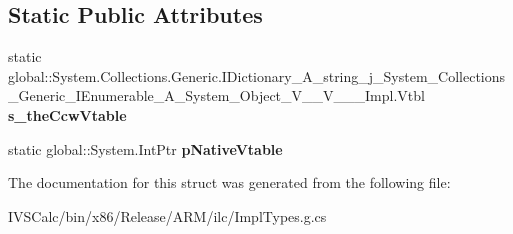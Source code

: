 \subsection*{Static Public Attributes}
\begin{DoxyCompactItemize}
\item 
\mbox{\label{struct_system_1_1_collections_1_1_generic_1_1_i_dictionary___a__string__j___system___collectionsedc27740e4e948ffc8828d48179ed85a_aba0e7207523bc23c4717824da3e0556f}} 
static global\+::\+System.\+Collections.\+Generic.\+I\+Dictionary\+\_\+\+A\+\_\+string\+\_\+j\+\_\+\+System\+\_\+\+Collections\+\_\+\+Generic\+\_\+\+I\+Enumerable\+\_\+\+A\+\_\+\+System\+\_\+\+Object\+\_\+\+V\+\_\+\+\_\+\+V\+\_\+\+\_\+\+\_\+\+Impl.\+Vtbl {\bfseries s\+\_\+the\+Ccw\+Vtable}
\item 
\mbox{\label{struct_system_1_1_collections_1_1_generic_1_1_i_dictionary___a__string__j___system___collectionsedc27740e4e948ffc8828d48179ed85a_a2e85dcfcd6ef0a898cc2aacfea2d9ddc}} 
static global\+::\+System.\+Int\+Ptr {\bfseries p\+Native\+Vtable}
\end{DoxyCompactItemize}


The documentation for this struct was generated from the following file\+:\begin{DoxyCompactItemize}
\item 
I\+V\+S\+Calc/bin/x86/\+Release/\+A\+R\+M/ilc/Impl\+Types.\+g.\+cs\end{DoxyCompactItemize}
